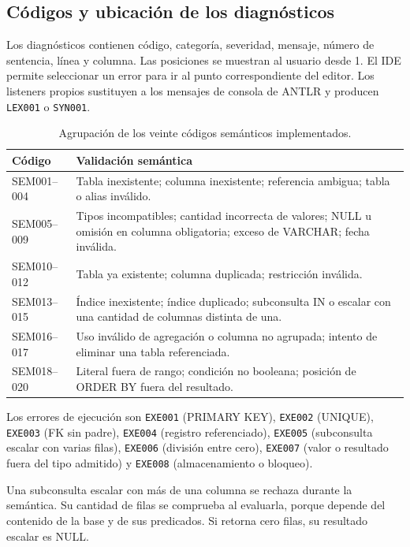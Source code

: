 \documentclass[11pt,a4paper]{article}
\begin{document}
\subsection{Códigos y ubicación de los diagnósticos}

Los diagnósticos contienen código, categoría, severidad, mensaje, número de
sentencia, línea y columna. Las posiciones se muestran al usuario desde 1.
El IDE permite seleccionar un error para ir al punto correspondiente del
editor. Los listeners propios sustituyen a los mensajes de consola de
ANTLR y producen \texttt{LEX001} o \texttt{SYN001}.

\begin{table}[H]\centering\small
\begin{tabularx}{\textwidth}{@{}L{2.6cm}Y@{}}
\toprule\textbf{Código} & \textbf{Validación semántica}\\\midrule
SEM001--004 & Tabla inexistente; columna inexistente; referencia ambigua;
tabla o alias inválido.\\
SEM005--009 & Tipos incompatibles; cantidad incorrecta de valores; NULL u
omisión en columna obligatoria; exceso de VARCHAR; fecha inválida.\\
SEM010--012 & Tabla ya existente; columna duplicada; restricción inválida.\\
SEM013--015 & Índice inexistente; índice duplicado; subconsulta IN o escalar
con una cantidad de columnas distinta de una.\\
SEM016--017 & Uso inválido de agregación o columna no agrupada; intento de
eliminar una tabla referenciada.\\
SEM018--020 & Literal fuera de rango; condición no booleana; posición de
ORDER BY fuera del resultado.\\
\bottomrule
\end{tabularx}
\caption{Agrupación de los veinte códigos semánticos implementados.}
\end{table}

Los errores de ejecución son \texttt{EXE001} (PRIMARY KEY), \texttt{EXE002}
(UNIQUE), \texttt{EXE003} (FK sin padre), \texttt{EXE004} (registro
referenciado), \texttt{EXE005} (subconsulta escalar con varias filas),
\texttt{EXE006} (división entre cero), \texttt{EXE007} (valor o resultado
fuera del tipo admitido) y \texttt{EXE008} (almacenamiento o bloqueo).

Una subconsulta escalar con más de una columna se rechaza durante la
semántica. Su cantidad de filas se comprueba al evaluarla, porque depende
del contenido de la base y de sus predicados. Si retorna cero filas,
su resultado escalar es NULL.
\end{document}
